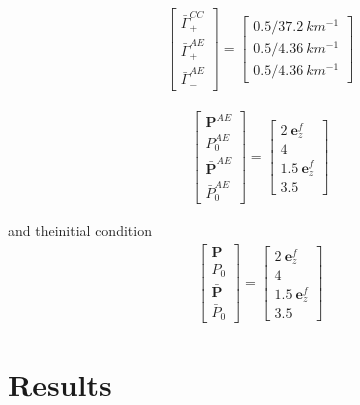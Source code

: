 \documentclass[aps,prd,twocolumn,amsmath,amssymb,groupedaddress]{revtex4-2}
\begin{document}
\begin{eqnarray}
	\begin{bmatrix}
		\bar{\Gamma}^{CC}_+ \\ \bar{\Gamma}^{AE}_+ \\ \bar{\Gamma}^{AE}_-
	\end{bmatrix}
	= \begin{bmatrix}
		0.5/37.2 ~km^{-1} \\ 0.5/4.36 ~km^{-1} \\ 0.5/4.36 ~km^{-1} 
	\end{bmatrix}
\end{eqnarray}

\begin{eqnarray}
	\begin{bmatrix}
		\textbf{P}^{AE} \\ P^{AE}_0 \\ \bar{\textbf{P}}^{AE} \\ \bar{P}^{AE}_0
	\end{bmatrix}
	= \begin{bmatrix}
		2 ~\textbf{e}_z^f\\ 4 \\ 1.5 ~\textbf{e}_z^f \\ 3.5
	\end{bmatrix}
\end{eqnarray}

and theinitial condition
\begin{eqnarray}
\begin{bmatrix}
	\textbf{P} \\ P_0 \\ \bar{\textbf{P}} \\ \bar{P}_0
\end{bmatrix}
= \begin{bmatrix}
	2 ~\textbf{e}_z^f\\ 4 \\ 1.5 ~\textbf{e}_z^f \\ 3.5
\end{bmatrix}
\end{eqnarray}

\section{\label{sec:results} Results}
\end{document}
